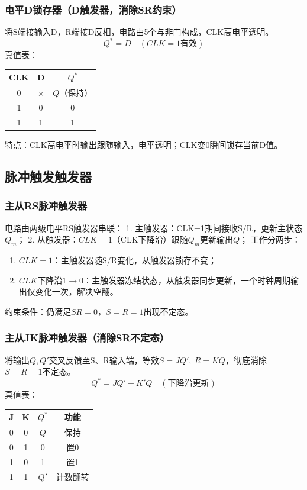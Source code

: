 \subsubsection{电平D锁存器（D触发器，消除SR约束）}
将S端接输入D，R端接D反相，电路由5个与非门构成，CLK高电平透明。
\[
Q^* = D \quad (CLK=1\text{有效})
\]
真值表：
\begin{center}
\setlength{\tabcolsep}{4pt}\small
\begin{tabular}{cc|c}
\toprule
CLK & D & $Q^*$ \\
\midrule
0 & $\times$ & $Q$（保持）\\
1 & 0 & 0 \\
1 & 1 & 1 \\
\bottomrule
\end{tabular}
\end{center}
特点：CLK高电平时输出跟随输入，电平透明；CLK变0瞬间锁存当前D值。

\subsection{脉冲触发触发器}
\subsubsection{主从RS脉冲触发器}
电路由两级电平RS触发器串联：
1. 主触发器：CLK=1期间接收S/R，更新主状态$Q_m$；
2. 从触发器：$\overline{CLK}=1$（CLK下降沿）跟随$Q_m$更新输出$Q$；
工作分两步：
\begin{enumerate}
    \item $CLK=1$：主触发器随S/R变化，从触发器锁存不变；
    \item $CLK$下降沿$1\rightarrow0$：主触发器冻结状态，从触发器同步更新，一个时钟周期输出仅变化一次，解决空翻。
\end{enumerate}
约束条件：仍满足$SR=0$，$S=R=1$出现不定态。

\subsubsection{主从JK脉冲触发器（消除SR不定态）}
将输出$Q,Q'$交叉反馈至S、R输入端，等效$S=JQ',\ R=KQ$，彻底消除$S=R=1$不定态。
\[
Q^* = JQ' + K'Q \quad (\text{下降沿更新})
\]
真值表：
\begin{center}
\setlength{\tabcolsep}{3pt}\small
\begin{tabular}{cc|cc}
\toprule
J & K & $Q^*$ & 功能 \\
\midrule
0 & 0 & $Q$ & 保持 \\
0 & 1 & 0 & 置0 \\
1 & 0 & 1 & 置1 \\
1 & 1 & $Q'$ & 计数翻转 \\
\bottomrule
\end{tabular}
\end{center}


